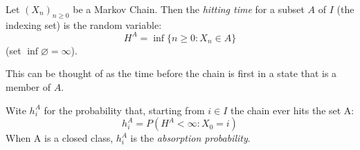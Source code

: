 \documentclass[12pt]{article}
\begin{document}
Let $(X_n)_{n\ge 0}$ be a Markov Chain. Then the \emph{hitting time} for a subset $A$ of $I$ (the indexing set) is the random variable:
\begin{displaymath}
H^A = \inf \{n\ge 0 : X_n\in A\}
\end{displaymath}
(set $\inf \varnothing = \infty$).

This can be thought of as the time before the chain is first in a state that is a member of $A$.

Wite $h_i^A$ for the probability  that, starting from $i\in I$ the chain ever hits the set A:
\begin{displaymath}
h_i^A = P(H^A <\infty : X_0 = i)
\end{displaymath}
When A is a closed class, $h_i^A$ is the \emph{absorption probability}.
\end{document}
